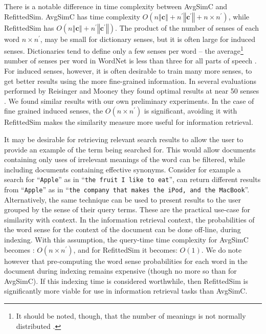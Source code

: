 \documentclass{article} %
\def\parencite{\cite} %
\renewcommand{\c}{\mathbf{c}}
\newcommand{\wordquote}[1]{\enquote{\texttt{#1}}}
\begin{document}
There is a notable difference in time complexity between AvgSimC and RefittedSim.
AvgSimC has time complexity $O(n\left\Vert \c\right\Vert +n^{\prime}\left\Vert \c^{\prime}\right\Vert +n\times n^{\prime})$,
while RefittedSim has $O(n\left\Vert \c\right\Vert +n^{\prime}\left\Vert \c^{\prime}\right\Vert)$.
The product of the number of senses of each word $n \times n^\prime$, may be small for dictionary senses, but it is often large for induced senses. Dictionaries tend to define only a few senses per word -- the average\footnote{It should be noted, though, that the number of meanings is not normally distributed \parencite{zipf1945meaning}.} number of senses per word in WordNet is less than three for all parts of speech \parencite{miller1995wordnet}. For induced senses, however, it is often desirable to train many more senses, to get better results using the more fine-grained information. In several evaluations performed by Reisinger and Mooney they found optimal results at near 50 senses \parencite{Reisinger2010}. We found similar results with our own preliminary experiments.
In the case of fine grained induced senses, the $O(n \times n^\prime)$ is significant, avoiding it with RefittedSim makes the similarity measure more useful for information retrieval.

It may be desirable for retrieving relevant search results to allow the user to provide an example of the term being searched for. This would allow documents containing only uses of irrelevant meanings of the word can be filtered, while  including documents containing effective synonyms. Consider for example a search for \wordquote{Apple} as in \wordquote{the fruit I like to eat}, can return different results from \wordquote{Apple} as in \wordquote{the company that makes the iPod, and the MacBook}. 
Alternatively, the same technique can be used to present results to the user grouped by the sense of their query terms.
These are the practical use-case for similarity with context.
In the information retrieval context, the probabilities of the word sense for the context of the document can be done off-line, during indexing. With this assumption, the query-time time complexity for AvgSimC becomes : $O(n\times n^{\prime})$, and for RefittedSim it becomes: $O(1)$.
We do note however that pre-computing the word sense probabilities for each word in the document during indexing remains expensive (though no more so than for AvgSimC). If this indexing time is considered worthwhile, then RefittedSim is significantly more viable for use in information retrieval tasks than AvgSimC.
\end{document}
